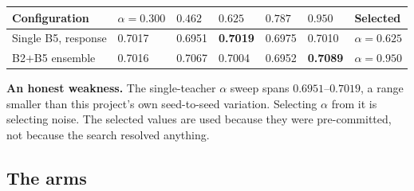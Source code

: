\documentclass[11pt]{article}
\newcommand{\tabnote}[1]{\par\vspace{2pt}{\footnotesize\itshape #1}\par}
\begin{document}
\begin{center}\small
\begin{tabular}{K q q q q q M}
\toprule
\textbf{Configuration} & $\alpha{=}0.300$ & $0.462$ & $0.625$ & $0.787$ & $0.950$ &
\textbf{Selected} \\
\midrule
Single B5, response   & 0.7017 & 0.6951 & \textbf{0.7019} & 0.6975 & 0.7010 & $\alpha=0.625$ \\
B2$+$B5 ensemble      & 0.7016 & 0.7067 & 0.7004 & 0.6952 & \textbf{0.7089} & $\alpha=0.950$ \\
\bottomrule
\end{tabular}
\end{center}

\tabnote{Validation mean Dice from the 15-epoch probes. The single-teacher curve is flat to within
$0.007$ across the whole range --- the selection is close to arbitrary and should be read as such.
The ensemble curve is only marginally better behaved.}

\begin{warnbox}
\textbf{An honest weakness.} The single-teacher $\alpha$ sweep spans $0.6951$--$0.7019$, a range
smaller than this project's own seed-to-seed variation. Selecting $\alpha$ from it is selecting
noise. The selected values are used because they were pre-committed, not because the search
resolved anything.
\end{warnbox}

\subsection{The arms}
\end{document}
